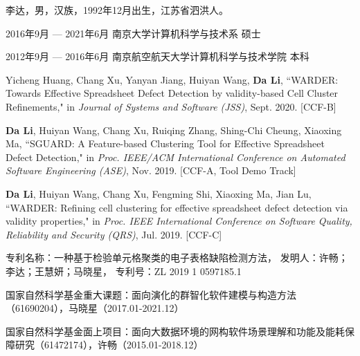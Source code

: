 \begin{resume}

  \begin{authorinfo}
  \noindent 李达，男，汉族，1992年12月出生，江苏省泗洪人。
  \end{authorinfo}

  \begin{education}
  \item[2016年9月 --- 2021年6月] 南京大学计算机科学与技术系 \hfill 硕士
  \item[2012年9月 --- 2016年6月] 南京航空航天大学计算机科学与技术学院 \hfill 本科
  \end{education}

  \begin{publications}
    \item Yicheng Huang, Chang Xu, Yanyan Jiang, Huiyan Wang, \textbf{Da Li}, ``WARDER: Towards Effective Spreadsheet Defect Detection by validity-based Cell Cluster Refinements," in \textsl{Journal of Systems and Software (JSS)}, Sept. 2020. [CCF-B]
    \item \textbf{Da Li}, Huiyan Wang, Chang Xu, Ruiqing Zhang, Shing-Chi Cheung, Xiaoxing Ma, ``SGUARD: A Feature-based Clustering Tool for Effective Spreadsheet Defect Detection," in \textsl{Proc. IEEE/ACM International Conference on Automated Software Engineering (ASE)}, Nov. 2019. [CCF-A, Tool Demo Track]
    \item \textbf{Da Li}, Huiyan Wang, Chang Xu, Fengming Shi, Xiaoxing Ma, Jian Lu, ``WARDER: Refining cell clustering for effective spreadsheet defect detection via validity properties," in \textsl{Proc. IEEE International Conference on Software Quality, Reliability and Security (QRS)}, Jul. 2019. [CCF-C]
    \item 专利名称：一种基于检验单元格聚类的电子表格缺陷检测方法，
    发明人：许畅；李达；王慧妍；马晓星，
    专利号：ZL 2019 1 0597185.1
  \end{publications}


  \begin{projects}
    \item 国家自然科学基金重大课题：面向演化的群智化软件建模与构造方法（61690204），马晓星（2017.01-2021.12）
    \item 国家自然科学基金面上项目：面向大数据环境的网构软件场景理解和功能及能耗保障研究（61472174），许畅（2015.01-2018.12）
  \end{projects}

\end{resume}

